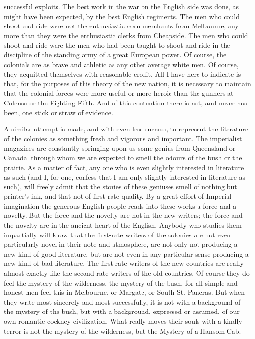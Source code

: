 successful exploits. The best work in the war on the English side was done, as might have been expected, by the best English regiments. The men who could shoot and ride were not the enthusiastic corn merchants from Melbourne, any more than they were the enthusiastic clerks from Cheapside. The men who could shoot and ride were the men who had been taught to shoot and ride in the discipline of the standing army of a great European power. Of course, the colonials are as brave and athletic as any other average white men. Of course, they acquitted themselves with reasonable credit. All I have here to indicate is that, for the purposes of this theory of the new nation, it is necessary to maintain that the colonial forces were more useful or more heroic than the gunners at Colenso or the Fighting Fifth. And of this contention there is not, and never has been, one stick or straw of evidence.

A similar attempt is made, and with even less success, to represent the literature of the colonies as something fresh and vigorous and important. The imperialist magazines are constantly springing upon us some genius from Queensland or Canada, through whom we are expected to smell the odours of the bush or the prairie. As a matter of fact, any one who is even slightly interested in literature as such (and I, for one, confess that I am only slightly interested in literature as such), will freely admit that the stories of these geniuses smell of nothing but printer’s ink, and that not of first-rate quality. By a great effort of Imperial imagination the generous English people reads into these works a force and a novelty. But the force and the novelty are not in the new writers; the force and the novelty are in the ancient heart of the English. Anybody who studies them impartially will know that the first-rate writers of the colonies are not even particularly novel in their note and atmosphere, are not only not producing a new kind of good literature, but are not even in any particular sense producing a new kind of bad literature. The first-rate writers of the new countries are really almost exactly like the second-rate writers of the old countries. Of course they do feel the mystery of the wilderness, the mystery of the bush, for all simple and honest men feel this in Melbourne, or Margate, or South St. Pancras. But when they write most sincerely and most successfully, it is not with a background of the mystery of the bush, but with a background, expressed or assumed, of our own romantic cockney civilization. What really moves their souls with a kindly terror is not the mystery of the wilderness, but the Mystery of a Hansom Cab.

